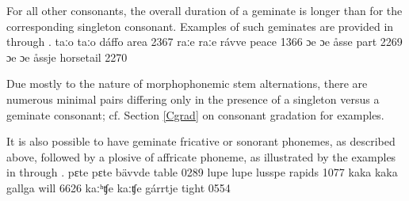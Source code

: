 For all other consonants, the overall duration of a geminate is longer than for the corresponding singleton consonant. Examples of such geminates are provided in  through .
	{taːo}	{taːo}	{dáffo}	{area\BS{}}		{2367}%
	{raːe}	{raːe}	{rávve}	{peace\BS{}}		{1366}%
	{ɔe}	{ɔe}	{åsse}	{part\BS{}}	{2269}
	{ɔe}	{ɔe}	{åssje}	{horsetail\BS{}}	{2270}

Due mostly to the nature of morphophonemic stem alternations, there are numerous minimal pairs differing only in the presence of a singleton versus a geminate consonant; cf. Section \ref{Cgrad} on consonant gradation for examples. %

It is also possible to have geminate fricative or sonorant phonemes, as described above, followed by a plosive of affricate phoneme, as illustrated by the examples in  through .
	{pɛte}	{pɛte}	{bävvde}	{table\BS{}}		{0289}%
	{lupe}	{lupe}	{lusspe}	{rapids\BS{}}		{1077}%
	{kaka}	{kaka}	{gallga}	{will\BS{}}		{6626}%
	{kaːʰʧe}	{kaːʧe}	{gárrtje}	{tight\BS{}}		{0554}%

